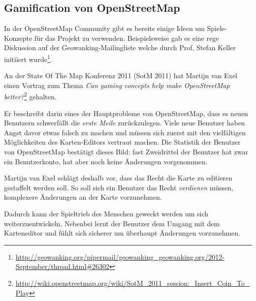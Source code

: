 \subsection{Gamification von OpenStreetMap}
In der OpenStreetMap Community gibt es bereits einige Ideen um Spiele-Konzepte für das Projekt zu verwenden.
Beispielsweise gab es eine rege Diskussion auf der Geowanking-Mailingliste welche durch Prof. Stefan Keller initiiert wurde\footnote{\url{http://geowanking.org/pipermail/geowanking_geowanking.org/2012-September/thread.html\#26302}}.

An der State Of The Map Konferenz 2011 (SotM 2011) hat Martijn van Exel  einen Vortrag zum Thema \emph{Can gaming concepts help make OpenStreetMap better?}\footnote{\url{http://wiki.openstreetmap.org/wiki/SotM_2011_session:_Insert_Coin_To_Play}} gehalten.

Er beschreibt darin eines der Hauptprobleme von OpenStreetMap, dass es neuen Benutzern schwerfällt die \emph{erste Meile} zurückzulegen.
Viele neue Benutzer haben Angst davor etwas falsch zu machen und müssen sich zuerst mit den vielfältigen Möglichkeiten des Karten-Editors vertraut machen.
Die Statistik der Benutzer von OpenStreetMap bestätigt dieses Bild: fast Zweidrittel der Benutzer hat zwar ein Benutzerkonto, hat aber noch keine Änderungen vorgenommen.

Martijn van Exel schlägt deshalb vor, dass das Recht die Karte zu editieren gestaffelt werden soll.
So soll sich ein Benutzer das Recht \emph{verdienen} müssen, komplexere Änderungen an der Karte vorzunehmen.

Dadurch kann der Spieltrieb des Menschen geweckt werden um sich weiterzuentwickeln.
Nebenbei lernt der Benutzer dem Umgang mit dem Karteneditor und fühlt sich sicherer um überhaupt Änderungen vorzunehmen.